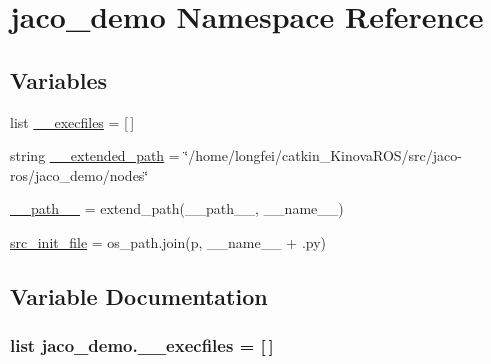 \hypertarget{namespacejaco__demo}{}\section{jaco\+\_\+demo Namespace Reference}
\label{namespacejaco__demo}
\subsection*{Variables}
\begin{DoxyCompactItemize}
\item 
list \hyperlink{namespacejaco__demo_ada50e7bb0d50193ddbee4715600f4ae0}{\+\_\+\+\_\+execfiles} = \mbox{[}$\,$\mbox{]}
\item 
string \hyperlink{namespacejaco__demo_af784247e9de42619c18a7e5d44c6b375}{\+\_\+\+\_\+extended\+\_\+path} = \char`\"{}/home/longfei/catkin\+\_\+\+Kinova\+R\+OS/src/jaco-\/ros/jaco\+\_\+demo/nodes\char`\"{}
\item 
\hyperlink{namespacejaco__demo_a2905ccdea36f19d995e18224d6687ad8}{\+\_\+\+\_\+path\+\_\+\+\_\+} = extend\+\_\+path(\+\_\+\+\_\+path\+\_\+\+\_\+, \+\_\+\+\_\+name\+\_\+\+\_\+)
\item 
\hyperlink{namespacejaco__demo_a3119f51bb1227df24870e8da520a08b8}{src\+\_\+init\+\_\+file} = os\+\_\+path.\+join(p, \+\_\+\+\_\+name\+\_\+\+\_\+ + \textquotesingle{}.py\textquotesingle{})
\end{DoxyCompactItemize}


\subsection{Variable Documentation}
\subsubsection[{\texorpdfstring{\+\_\+\+\_\+execfiles}{__execfiles}}]{\setlength{\rightskip}{0pt plus 5cm}list jaco\+\_\+demo.\+\_\+\+\_\+execfiles = \mbox{[}$\,$\mbox{]}\hspace{0.3cm}{\ttfamily [private]}}\hypertarget{namespacejaco__demo_ada50e7bb0d50193ddbee4715600f4ae0}{}\label{namespacejaco__demo_ada50e7bb0d50193ddbee4715600f4ae0}
